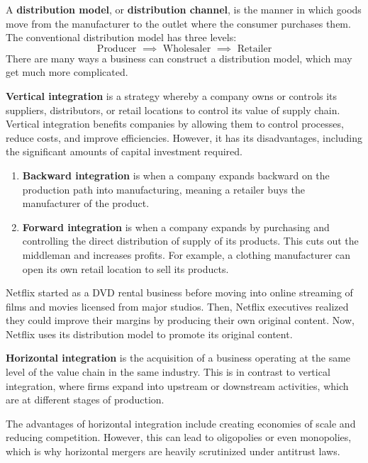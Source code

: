 \documentclass{article}
\begin{document}
      \begin{definition}
        A \textbf{distribution model}, or \textbf{distribution channel}, is the manner in which goods move from the manufacturer to the outlet where the consumer purchases them. The conventional distribution model has three levels:
        \[\text{Producer } \implies \text{ Wholesaler } \implies \text{ Retailer}\]
        There are many ways a business can construct a distribution model, which may get much more complicated. 
      \end{definition}

      \begin{definition}
        \textbf{Vertical integration} is a strategy whereby a company owns or controls its suppliers, distributors, or retail locations to control its value of supply chain. Vertical integration benefits companies by allowing them to control processes, reduce costs, and improve efficiencies. However, it has its disadvantages, including the significant amounts of capital investment required. 
        \begin{enumerate}
            \item \textbf{Backward integration} is when a company expands backward on the production path into manufacturing, meaning a retailer buys the manufacturer of the product. 
            \item \textbf{Forward integration} is when a company expands by purchasing and controlling the direct distribution of supply of its products. This cuts out the middleman and increases profits. For example, a clothing manufacturer can open its own retail location to sell its products. 
        \end{enumerate}
      \end{definition}

      \begin{example}[Netflix]
        Netflix started as a DVD rental business before moving into online streaming of films and movies licensed from major studios. Then, Netflix executives realized they could improve their margins by producing their own original content. Now, Netflix uses its distribution model to promote its original content. 
      \end{example}

      \begin{definition}
        \textbf{Horizontal integration} is the acquisition of a business operating at the same level of the value chain in the same industry. This is in contrast to vertical integration, where firms expand into upstream or downstream activities, which are at different stages of production. 

        The advantages of horizontal integration include creating economies of scale and reducing competition. However, this can lead to oligopolies or even monopolies, which is why horizontal mergers are heavily scrutinized under antitrust laws. 
      \end{definition}
\end{document}
